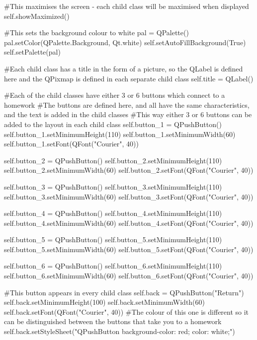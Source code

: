 \begin{landscape}
\begin{python}
        #This maximises the screen - each child class will be maximised when displayed
        self.showMaximized()

        #This sets the background colour to white
        pal = QPalette()
        pal.setColor(QPalette.Background, Qt.white)
        self.setAutoFillBackground(True)
        self.setPalette(pal)

        #Each child class has a title in the form of a picture, so the QLabel is defined here and the QPixmap is defined in each separate child class
        self.title = QLabel()

        #Each of the child classes have either 3 or 6 buttons which connect to a homework
        #The buttons are defined here, and all have the same characteristics, and the text is added in the child classes
        #This way either 3 or 6 buttons can be added to the layout in each child class
        self.button_1 = QPushButton()
        self.button_1.setMinimumHeight(110)
        self.button_1.setMinimumWidth(60)
        self.button_1.setFont(QFont("Courier", 40))
        
        self.button_2 = QPushButton()
        self.button_2.setMinimumHeight(110)
        self.button_2.setMinimumWidth(60)
        self.button_2.setFont(QFont("Courier", 40))
        
        self.button_3 = QPushButton()
        self.button_3.setMinimumHeight(110)
        self.button_3.setMinimumWidth(60)
        self.button_3.setFont(QFont("Courier", 40))
        
        self.button_4 = QPushButton()
        self.button_4.setMinimumHeight(110)
        self.button_4.setMinimumWidth(60)
        self.button_4.setFont(QFont("Courier", 40))
        
        self.button_5 = QPushButton()
        self.button_5.setMinimumHeight(110)
        self.button_5.setMinimumWidth(60)
        self.button_5.setFont(QFont("Courier", 40))
        
        self.button_6 = QPushButton()
        self.button_6.setMinimumHeight(110)
        self.button_6.setMinimumWidth(60)
        self.button_6.setFont(QFont("Courier", 40))

        #This button appears in every child class
        self.back = QPushButton("Return")
        self.back.setMinimumHeight(100)
        self.back.setMinimumWidth(60)
        self.back.setFont(QFont("Courier", 40))
        #The colour of this one is different so it can be distinguished between the buttons that take you to a homework
        self.back.setStyleSheet("QPushButton {background-color: red; color: white;}")


\end{python}
\end{landscape}
